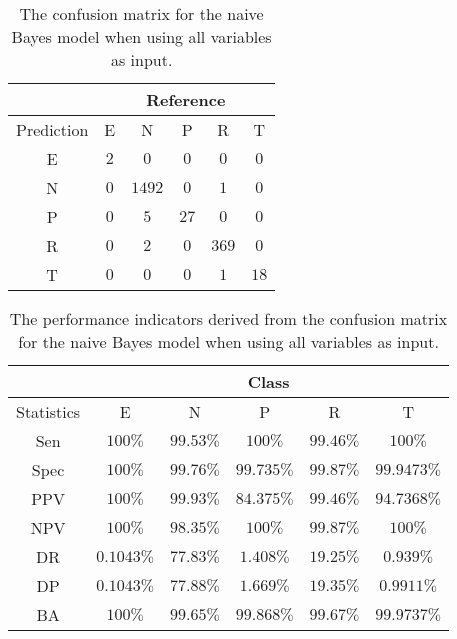 \begin{table}[!ht]
	\centering
	\begin{tabular}{|c|c|c|c|c|c|}
		\hline
		 & \multicolumn{5}{|c|}{Reference} \\ \hline
		 Prediction & E & N & P & R & T \\ \hline
		 E & $2$ & $0$ & $0$ & $0$ & $0$ \\ \hline
		 N & $0$ & $1492$ & $0$ & $1$ & $0$ \\ \hline
		 P & $0$ & $5$ & $27$ & $0$ & $0$ \\ \hline
		 R & $0$ & $2$ & $0$ & $369$ & $0$ \\ \hline
		 T & $0$ & $0$ & $0$ & $1$ & $18$ \\ \hline
	\end{tabular}
	\caption{The confusion matrix for the naive Bayes model when using all variables as input.}
	\label{tab:cm:all:nb}
\end{table}

\begin{table}[!ht]
	\centering
	\begin{tabular}{|c|c|c|c|c|c|}
		\hline
		 & \multicolumn{5}{c|}{Class} \\ \hline
		Statistics & E & N & P & R & T \\ \hline
		Sen & $100\%$ & $99.53\%$ & $100\%$ & $99.46\%$ & $100\%$ \\ \hline
		Spec & $100\%$ & $99.76\%$ & $99.735\%$ & $99.87\%$ & $99.9473\%$ \\ \hline
		PPV & $100\%$ & $99.93\%$ & $84.375\%$ & $99.46\%$ & $94.7368\%$ \\ \hline
		NPV & $100\%$ & $98.35\%$ & $100\%$ & $99.87\%$ & $100\%$ \\ \hline
		DR & $0.1043\%$ & $77.83\%$ & $1.408\%$ & $19.25\%$ & $0.939\%$ \\ \hline
		DP & $0.1043\%$ & $77.88\%$ & $1.669\%$ & $19.35\%$ & $0.9911\%$ \\ \hline
		BA & $100\%$ & $99.65\%$ & $99.868\%$ & $99.67\%$ & $99.9737\%$ \\ \hline
	\end{tabular}
	\caption{The performance indicators derived from the confusion matrix for the naive Bayes model when using all variables as input.}
	\label{tab:cs:reverse:all:nb}
\end{table}
